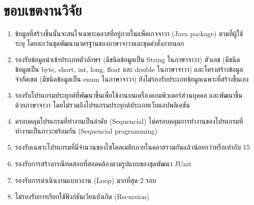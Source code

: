 \section{ขอบเขตงานวิจัย}

\begin{enumerate}
    \item ข้อมูล{\scg}ที่สร้างขึ้นนั้นจะสนใจเฉพาะคลาสที่อยู่ภายในแพ็คเกจจาวา (Java package) ตามที่ผู้ใช้ระบุ 
        โดยละเว้นชุดพัฒนามาตรฐานของภาษาจาวาและชุดคำสั่งภายนอก
    \item รองรับข้อมูลนำเข้าประเภทตัวอักษร (มีชนิดข้อมูลเป็น String ในภาษาจาวา) ตัวเลข 
        (มีชนิดข้อมูลเป็น byte, short, int, long, float และ double ในภาษาจาวา) และโครงสร้างข้อมูลจำกัดเขต (มีชนิดข้อมูลเป็น enum ในภาษาจาวา) 
        ยังไม่รองรับประเภทข้อมูลเฉพาะที่สร้างขึ้นเอง
    \item รองรับโปรแกรมประยุกต์ที่พัฒนาขึ้นเพื่อใช้งานบนเครื่องคอมพิวเตอร์ส่วนบุคคล และ{\sourcecode}พัฒนาขึ้นด้วยภาษาจาวา 
        โดยไม่รวมถึงโปรแกรมประยุกต์ประเภทเว็บแอปพลิเคชัน
    \item ครอบคลุมโปรแกรมที่ทำงานเป็นลำดับ (Sequencial) ไม่ครอบคลุมการทำงานของโปรแกรมที่ทำงานเป็นภาวะพร้อมกัน (Sequencial programming)
    \item รองรับเฉพาะโปรแกรมที่มีจำนวนของไซโคลเมทิกภายในคลาสรวมกันแล้วน้อยกว่าหรือเท่ากับ 15
    \item รองรับการสร้างกรณีทดสอบที่สอดคล้องตามรูปแบบของชุดพัฒนา JUnit
    \item รองรับการดำเนินงานแบบวงวน (Loop) มากที่สุด 2 รอบ
    \item ไม่รองรับการเรียกใช้ฟังก์ชันเวียนบังเกิด (Recursion)
\end{enumerate}
